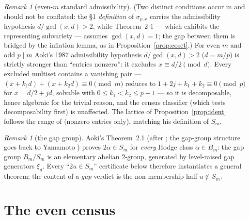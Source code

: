 \documentclass[11pt]{amsart}
\theoremstyle{remark}
\newtheorem{remark}[theorem]{Remark}
\begin{document}
\begin{remark}[even-$m$ standard admissibility]\label{rem:evenstd}
(Two distinct conditions occur in \cite{Aoki87} and should not be conflated: the \S1
\emph{definition} of $\sigma_{p,x}$ carries the admissibility hypothesis $d/\gcd(x,d)>2$, while
Theorem~2-1 --- which exhibits the representing subvariety --- assumes $\gcd(x,d)=1$; the gap
between them is bridged by the inflation lemma, as in Proposition~\ref{prop:coset}.)
For even $m$ and odd $p\mid m$ Aoki's 1987 admissibility hypothesis $d/\gcd(x,d)>2$ ($d=m/p$) is
strictly stronger than ``entries nonzero'': it excludes $x\equiv d/2\pmod d$. Every excluded
multiset contains a vanishing pair --- $(x+k_1d)+(x+k_2d)\equiv0\pmod m$ reduces to
$1+2j+k_1+k_2\equiv0\pmod p$ for $x=d/2+jd$, solvable with $0\le k_1<k_2\le p-1$ --- so it is
decomposable, hence algebraic for the trivial reason, and the census classifier (which tests
decomposability first) is unaffected. The lattice of Proposition~\ref{prop:ident} follows the
range of \cite[\S2]{Aoki00} (nonzero entries only), matching his definition of $S_m$.
\end{remark}

\begin{remark}[the gap group]\label{rem:gap}
Aoki's Theorem~2.1 \cite{Aoki00} (after \cite[Thm.~D]{AokiD}; the gap-group structure goes back
to Yamamoto \cite{Yamamoto}) proves $2\alpha\in S_m$ for \emph{every} Hodge class $\alpha\in
B_m$: the gap group $B_m/S_m$ is an elementary abelian $2$-group, generated by level-raised gap
generators $\xi_d$. Every ``$2u\in S_m$'' certificate below therefore instantiates a general theorem; the
content of a \emph{gap} verdict is the non-membership half $u\notin S_m$.
\end{remark}

\section{The even census}\label{sec:census}
\end{document}
